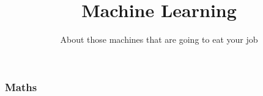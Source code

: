 
\usepackage{centernot}
\usepackage[]{algorithm2e}

\title
{Machine Learning}
\subtitle{About those machines that are going to eat your job}



\begin{frame}
  \titlepage
\end{frame}




\begin{frame}
\end{frame}

\begin{frame}
\end{frame}

\begin{frame}
\end{frame}

\begin{frame}
\end{frame}

\begin{frame}
\end{frame}

\begin{frame}
\end{frame}

\begin{frame}
  \frametitle{Maths}
  \vspace{7mm}
  \vspace{7mm}
\end{frame}

\begin{frame}
  \vspace{4mm}
  
  \vspace{-3mm}
\end{frame}

\begin{frame}
\end{frame}

